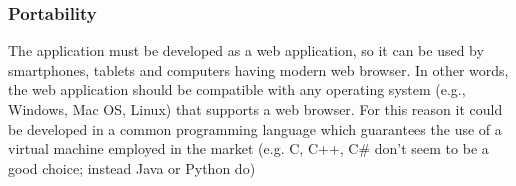 \subsubsection{Portability}
The application must be developed as a web application, so it can be used by smartphones, tablets and computers having modern web browser. In other words, the web application should be compatible with any operating system (e.g., Windows, Mac OS, Linux) that supports a web browser. For this reason it could be developed in a common programming language which guarantees the use of a virtual machine employed in the market (e.g. C, C++, C# don't seem to be a good choice; instead Java or Python do) 

